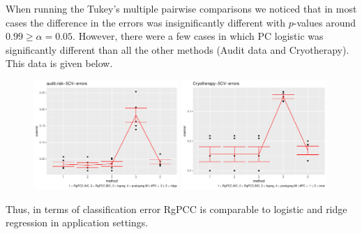 \documentclass[main.tex]{subfiles}
\begin{document}
When running the Tukey's multiple pairwise comparisons we noticed that in most cases the difference in the errors was insignificantly different with $p$-values around $0.99 \geq \alpha = 0.05$. However, there were a few cases in which PC logistic was significantly different than all the other methods (Audit data and Cryotherapy). This data is given below.

\begin{figure}[H]
    \centering
    \includegraphics[width =  0.49\textwidth]{realworld/audit.risk-5CV-errors graph.pdf}
    \includegraphics[width =  0.49\textwidth]{realworld/Cryotherapy-5CV-errors graph.pdf}
    \label{fig:my_label}
\end{figure}

Thus, in terms of classification error RgPCC is comparable to logistic and ridge regression in application settings.
\end{document}
